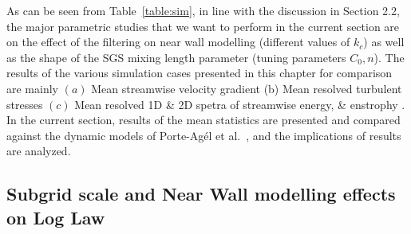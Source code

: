 {{As can be seen from} Table~\ref{table:sim}, {in line with the discussion in Section 2.2}, the major parametric stud{ies} that we want to perform in the current section are {on} the effect of the filtering on near wall modelling (different values of $k_c$) as well as the shape of the SGS mixing length parameter (tuning parameters $C_0, n$).}  The results of the various simulation cases presented in this chapter for comparison are mainly $(a)$ {Mean streamwise velocity gradient} (b) Mean resolved turbulent stresses $(c)$ {Mean resolved 1D \& 2D spetra of streamwise energy, \& enstrophy }. In the current section, results of the mean statistics are presented and compared against the dynamic models of Porte-Ag\'{e}l et al.~\cite{porte1fun}, {and the implications of results are analyzed}.
\subsection{Subgrid scale and Near Wall modelling effects on Log Law}
